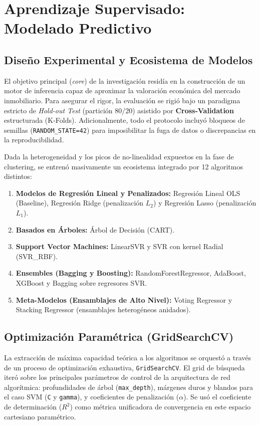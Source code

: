 \chapter{Aprendizaje Supervisado: Modelado Predictivo}

\section{Diseño Experimental y Ecosistema de Modelos}
El objetivo principal (\textit{core}) de la investigación residía en la construcción de un motor de inferencia capaz de aproximar la valoración económica del mercado inmobiliario. 
Para asegurar el rigor, la evaluación se rigió bajo un paradigma estricto de \textit{Hold-out Test} (partición 80/20) asistido por \textbf{Cross-Validation} estructurada (K-Folds). Adicionalmente, todo el protocolo incluyó bloqueos de semillas (\texttt{RANDOM\_STATE=42}) para imposibilitar la fuga de datos o discrepancias en la reproducibilidad.

Dada la heterogeneidad y los picos de no-linealidad expuestos en la fase de clustering, se entrenó masivamente un ecosistema integrado por 12 algoritmos distintos:
\begin{enumerate}
    \item \textbf{Modelos de Regresión Lineal y Penalizados:} Regresión Lineal OLS (Baseline), Regresión Ridge (penalización $L_2$) y Regresión Lasso (penalización $L_1$).
    \item \textbf{Basados en Árboles:} Árbol de Decisión (CART).
    \item \textbf{Support Vector Machines:} LinearSVR y SVR con kernel Radial (SVR\_RBF).
    \item \textbf{Ensembles (Bagging y Boosting):} RandomForestRegressor, AdaBoost, XGBoost \cite{chen2016xgboost} y Bagging sobre regresores SVR.
    \item \textbf{Meta-Modelos (Ensamblajes de Alto Nivel):} Voting Regressor y Stacking Regressor (ensamblajes heterogéneos anidados).
\end{enumerate}

\section{Optimización Paramétrica (GridSearchCV)}
La extracción de máxima capacidad teórica a los algoritmos se orquestó a través de un proceso de optimización exhaustiva, \texttt{GridSearchCV}. El grid de búsqueda iteró sobre los principales parámetros de control de la arquitectura de red algorítmica: profundidades de árbol (\texttt{max\_depth}), márgenes duros y blandos para el caso SVM (\texttt{C} y \texttt{gamma}), y coeficientes de penalización ($\alpha$). Se usó el coeficiente de determinación ($R^2$) como métrica unificadora de convergencia en este espacio cartesiano paramétrico.

